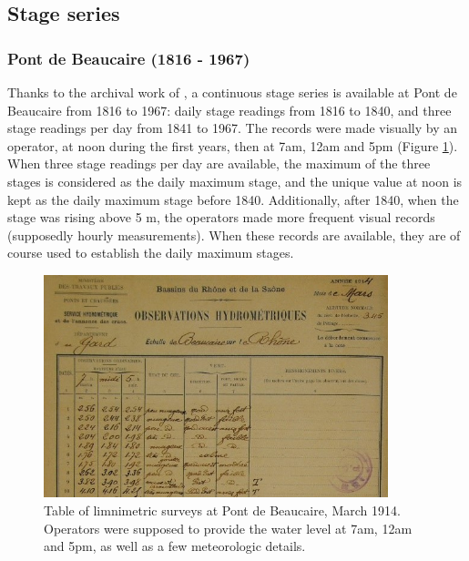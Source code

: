 \documentclass[11pt]{article}
\begin{document}
    \subsection{Stage series}

    \subsubsection{Pont de Beaucaire (1816 - 1967)}
    
    Thanks to the archival work of \citet{pichard_hydro-climatology_2017}, a continuous stage series is available at Pont de Beaucaire from 1816 to 1967: daily stage readings from 1816 to 1840, and three stage readings per day from 1841 to 1967. The records were made visually by an operator, at noon during the first years, then at 7am, 12am and 5pm (Figure \ref{fig:TabObsPt}). When three stage readings per day are available, the maximum of the three stages is considered as the daily maximum stage, and the unique value at noon is kept as the daily maximum stage before 1840. Additionally, after 1840, when the stage was rising above 5 m, the operators made more frequent visual records (supposedly hourly measurements). When these records are available, they are of course used to establish the daily maximum stages.
    
        \begin{figure}[h]
            \centering
            \includegraphics[width = 10cm]{Figs/4-TabObsBcrSmall.jpg}
            \caption{Table of limnimetric surveys at Pont de Beaucaire, March 1914. Operators were supposed to provide the water level at 7am, 12am and 5pm, as well as a few meteorologic details. \citep{pontschaussees_observations_1914}}
            \label{fig:TabObsPt}
        \end{figure}
        
\end{document}
